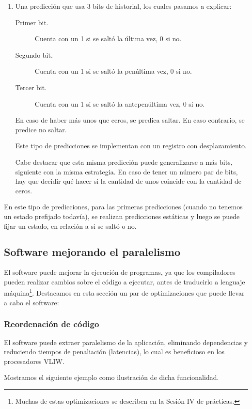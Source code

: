 \begin{enumerate}
    \item Una predicción que usa 3 bits de historial, los cuales pasamos a explicar:
        \begin{description}
            \item [Primer bit.] Cuenta con un 1 si se saltó la última vez, 0 si no.
            \item [Segundo bit.] Cuenta con un 1 si se saltó la penúltima vez, 0 si no.
            \item [Tercer bit.] Cuenta con un 1 si se saltó la antepenúltima vez, 0 si no.
        \end{description}
        En caso de haber más unos que ceros, se predica saltar. En caso contrario, se predice no saltar. 

        Este tipo de predicciones se implementan con un registro con desplazamiento.

        Cabe destacar que esta misma predicción puede generalizarse a más bits, siguiente con la misma estrategia. En caso de tener un número par de bits, hay que decidir qué hacer si la cantidad de unos coincide con la cantidad de ceros.
\end{enumerate}
En este tipo de predicciones, para las primeras predicciones (cuando no tenemos un estado prefijado todavía), se realizan predicciones estáticas y luego se puede fijar un estado, en relación a si se saltó o no.

\subsection{Software mejorando el paralelismo}
El software puede mejorar la ejecución de programas, ya que los compiladores pueden realizar cambios sobre el código a ejecutar, antes de traducirlo a lenguaje máquina\footnote{Muchas de estas optimizaciones se describen en la Sesión IV de prácticas.}. Destacamos en esta sección un par de optimizaciones que puede llevar a cabo el software:

\subsubsection{Reordenación de código}
El software puede extraer paralelismo de la aplicación, eliminando dependencias y reduciendo tiempos de penaliación (latencias), lo cual es beneficioso en los procesadores VLIW.

Mostramos el siguiente ejemplo como ilustración de dicha funcionalidad.

